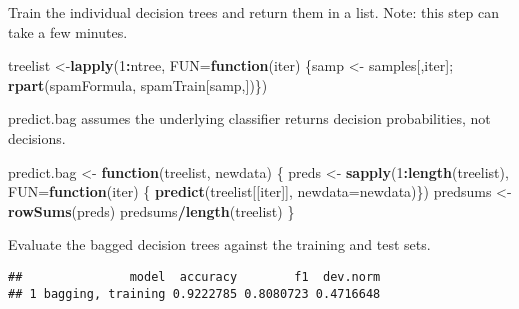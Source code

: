 \documentclass[]{article}
\newenvironment{Shaded}{\begin{snugshade}}{\end{snugshade}}
\newcommand{\ControlFlowTok}[1]{\textcolor[rgb]{0.13,0.29,0.53}{\textbf{#1}}}
\newcommand{\DataTypeTok}[1]{\textcolor[rgb]{0.13,0.29,0.53}{#1}}
\newcommand{\DecValTok}[1]{\textcolor[rgb]{0.00,0.00,0.81}{#1}}
\newcommand{\KeywordTok}[1]{\textcolor[rgb]{0.13,0.29,0.53}{\textbf{#1}}}
\newcommand{\NormalTok}[1]{#1}
\newcommand{\OperatorTok}[1]{\textcolor[rgb]{0.81,0.36,0.00}{\textbf{#1}}}
\newcommand{\StringTok}[1]{\textcolor[rgb]{0.31,0.60,0.02}{#1}}
\begin{document}
Train the individual decision trees and return them in a list. Note:
this step can take a few minutes.

\begin{Shaded}
\begin{Highlighting}[]
\NormalTok{treelist <-}\KeywordTok{lapply}\NormalTok{(}\DecValTok{1}\OperatorTok{:}\NormalTok{ntree,}
\DataTypeTok{FUN=}\ControlFlowTok{function}\NormalTok{(iter)}
\NormalTok{\{samp <-}\StringTok{ }\NormalTok{samples[,iter];}
\KeywordTok{rpart}\NormalTok{(spamFormula, spamTrain[samp,])\})}
\end{Highlighting}
\end{Shaded}

predict.bag assumes the underlying classifier returns decision
probabilities, not decisions.

\begin{Shaded}
\begin{Highlighting}[]
\NormalTok{predict.bag <-}\StringTok{ }\ControlFlowTok{function}\NormalTok{(treelist, newdata) \{}
\NormalTok{preds <-}\StringTok{ }\KeywordTok{sapply}\NormalTok{(}\DecValTok{1}\OperatorTok{:}\KeywordTok{length}\NormalTok{(treelist),}
\DataTypeTok{FUN=}\ControlFlowTok{function}\NormalTok{(iter) \{}
\KeywordTok{predict}\NormalTok{(treelist[[iter]], }\DataTypeTok{newdata=}\NormalTok{newdata)\})}
\NormalTok{predsums <-}\StringTok{ }\KeywordTok{rowSums}\NormalTok{(preds)}
\NormalTok{predsums}\OperatorTok{/}\KeywordTok{length}\NormalTok{(treelist)}
\NormalTok{\}}
\end{Highlighting}
\end{Shaded}

Evaluate the bagged decision trees against the training and test sets.

\begin{Shaded}
\end{Shaded}

\begin{verbatim}
##               model  accuracy        f1  dev.norm
## 1 bagging, training 0.9222785 0.8080723 0.4716648
\end{verbatim}
\end{document}
